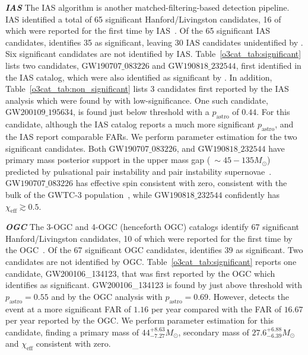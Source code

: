 \begin{refsection}
\textbf{\emph{IAS}} The IAS algorithm is another matched-filtering-based detection pipeline. 
IAS identified a total of 65 significant Hanford/Livingston candidates, 16 of which were reported for the first time by IAS~\cite{ias_o3a, ias_o3b}. 
Of the 65 significant IAS candidates, \aframe identifies 35 as significant, leaving 30 IAS candidates unidentified by \aframe. 
Six \aframe significant candidates are not identified by IAS. 
Table~\ref{o3cat_tab:significant} lists two candidates, $\mathrm{GW}190707\_083226$ and $\mathrm{GW}190818\_232544$, first identified in the IAS catalog, which were also identified as significant by \aframe. 
In addition, Table~\ref{o3cat_tab:non_significant} lists 3 candidates first reported by the IAS analysis which were found by \aframe with low-significance. 
One such candidate, $\mathrm{GW}200109\_195634$, is found just below threshold with a $p_\mathrm{astro}$ of $0.44$. 
For this candidate, although the IAS catalog reports a much more significant $p_\mathrm{astro}$, \aframe and the IAS report comparable FARs. 
We perform parameter estimation for the two significant candidates. 
Both $\mathrm{GW}190707\_083226$, and $\mathrm{GW}190818\_232544$ have primary mass posterior support in the upper mass gap ($~\sim45-135 M_\odot$) predicted by pulsational pair instability and pair instability supernovae~\cite{Woosley_2021}.
$\mathrm{GW}190707\_083226$ has effective spin consistent with zero, consistent with the bulk of the GWTC-3 population~\cite{gwtc-3-astro}, while $\mathrm{GW}190818\_232544$ confidently has $\chi_{\mathrm{eff}} \gtrsim 0.5$. 

\textbf{\emph{OGC}} The 3-OGC and 4-OGC (henceforth OGC) catalogs identify 67 significant Hanford/Livingston candidates, 10 of which were reported for the first time by the OGC~\cite{3-ogc, 4-ogc}. 
Of the 67 significant OGC candidates, \aframe identifies 39 as significant. 
Two \aframe candidates are not identified by OGC. 
Table~\ref{o3cat_tab:significant} reports one candidate, GW200106\_134123, that was first reported by the OGC which \aframe identifies as significant. 
GW200106\_134123 is found by \aframe just above threshold with $p_\mathrm{astro} = 0.55$ and by the OGC analysis with $p_\mathrm{astro} = 0.69$. 
However, \aframe detects the event at a more significant FAR of $1.16$ per year compared with the FAR of $16.67$ per year reported by the OGC. 
We perform parameter estimation for this candidate, finding a primary mass of $44^{+8.63}_{-7.27} M_{\odot}$, secondary mass of $27.6^{+6.88}_{-6.39} M_{\odot}$ and $\chi_{\mathrm{eff}}$ consistent with zero.


\end{refsection}
